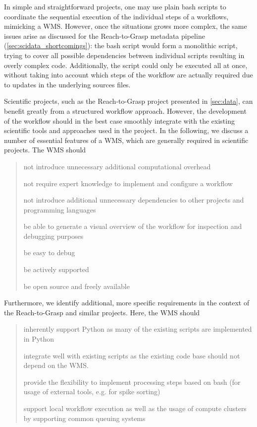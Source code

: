 In simple and straightforward projects, one may use plain bash scripts to coordinate the sequential execution of the individual steps of a workflows, mimicking a WMS. However, once the situations grows more complex, the same issues arise as discussed for the Reach-to-Grasp metadata pipeline (\cref{sec:scidata_shortcomings}): the bash script would form a monolithic script, trying to cover all possible dependencies between individual scripts resulting in overly complex code. Additionally, the script could only be executed all at once, without taking into account which steps of the workflow are actually required due to updates in the underlying sources files.

Scientific projects, such as the Reach-to-Grasp project presented in \cref{sec:data}, can benefit greatly from a structured workflow approach. However, the development of the workflow should in the best case smoothly integrate with the existing scientific tools and approaches used in the project. In the following, we discuss a number of essential features of a WMS, which are generally required in scientific projects. The WMS should 
\begin{quote}
\begin{description}
 \setlength{\itemsep}{5pt}
 \setlength{\parskip}{0pt}
 \setlength{\parsep}{0pt}
 \item[slim] not introduce unnecessary additional computational overhead
 \item[easy]  not require expert knowledge to implement and configure a workflow
 \item[standalone] not introduce additional unnecessary dependencies to other projects and programming languages
  \item[visual] be able to generate a visual overview of the workflow for inspection and debugging purposes
  \item[debuggable] be easy to debug
  \item[active] be actively supported
  \item[open] be open source and freely available\\
\end{description}
\end{quote}
Furthermore, we identify additional, more specific requirements in the context of the Reach-to-Grasp and similar projects. Here, the WMS should
\begin{quote}
\begin{description}
 \setlength{\itemsep}{5pt}
 \setlength{\parskip}{0pt}
 \setlength{\parsep}{0pt}
 \item[Python] inherently support Python as many of the existing scripts are implemented in Python
 \item[integration] integrate well with existing scripts as the existing code base should not depend on the WMS.
 \item[flexibility] provide the flexibility to implement processing steps based on bash (for usage of external tools, e.g. for spike sorting)
 \item[HPC] support local workflow execution as well as the usage of compute clusters by supporting common queuing systems
\end{description}
\end{quote}

